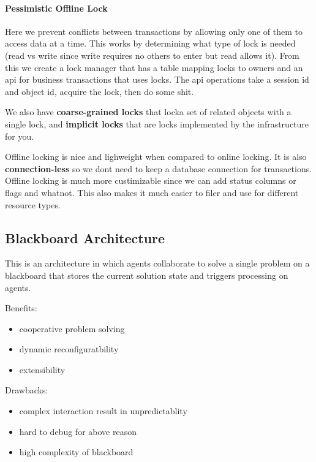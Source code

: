 \documentclass{article}
\begin{document}
\paragraph{Pessimistic Offline Lock} %
\label{par:pessimistic_offline_lock}
Here we prevent conflicts between transactions by allowing only one of them to access data at a time. This works by determining what type of lock is needed (read vs write since write requires no others to enter but read allows it). From this we create a lock manager that has a table mapping locks to owners and an api for business transactions that uses locks. The api operations take a session id and object id, acquire the lock, then do some shit.

We also have \textbf{coarse-grained locks} that locka  set of related objects with a single lock, and \textbf{implicit locks} that are locks implemented by the infrastructure for you.

Offline locking is nice and lighweight when compared to online locking. It is also \textbf{connection-less} so we dont need to keep a database connection for transactions. Offline locking is much more custimizable since we can add status columns or flags and whatnot. This also makes it much easier to filer and use for different resource types.

\subsection*{Blackboard Architecture} %
\label{sub:blackboard_architecture}
This is an architecture in which agents collaborate to solve a single problem on a blackboard that stores the current solution state and triggers processing on agents.

Benefits:
\begin{itemize}
    \item cooperative problem solving
    \item dynamic reconfiguratbility
    \item extensibility
\end{itemize}

Drawbacks:
\begin{itemize}
    \item complex interaction result in unpredictablity
    \item hard to debug for above reason
    \item high complexity of blackboard
\end{itemize}
\end{document}
